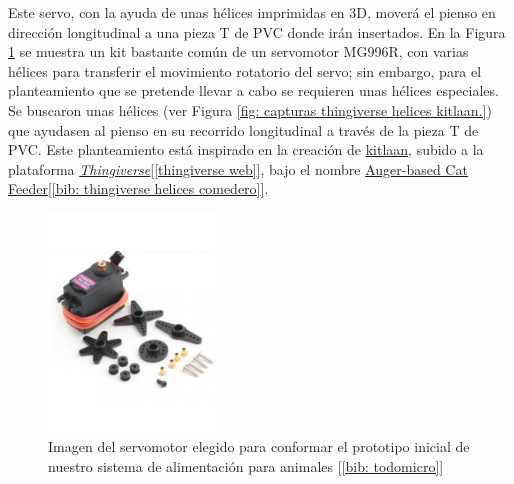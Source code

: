 \documentclass[12pt]{article}
\begin{document}
	\noindent Este servo, con la ayuda de unas hélices imprimidas en 3D, moverá el pienso en dirección longitudinal a una pieza T de PVC donde irán insertados. En la Figura \ref{Imagen servomotor MG996R} se muestra un kit bastante común de un servomotor MG996R, con varias hélices para transferir el movimiento rotatorio del servo; sin embargo, para el planteamiento que se pretende llevar a cabo se requieren unas hélices especiales. Se buscaron unas hélices (ver Figura \ref{fig: capturas thingiverse helices kitlaan.}) que ayudasen al pienso en su recorrido longitudinal a través de la pieza T de PVC. Este planteamiento está inspirado en la creación de \href{https://www.thingiverse.com/kitlaan/designs}{kitlaan}, subido a la plataforma \href{https://www.thingiverse.com/}{\textit{Thingiverse}}[\ref{thingiverse web}], bajo el nombre \href{https://www.thingiverse.com/thing:27854}{Auger-based Cat Feeder}[\ref{bib: thingiverse helices comedero}]. 
	
	\pagebreak
	
	\begin{figure}[h!]
		\begin{center}
			\includegraphics[width=0.4\textwidth]{img/servo_mg996r.jpg}
			\caption{Imagen del servomotor elegido para conformar el prototipo inicial de nuestro sistema de alimentación para animales [\ref{bib: todomicro}]}
			\label{Imagen servomotor MG996R}
		\end{center}
	\end{figure}
	
	
\end{document}
